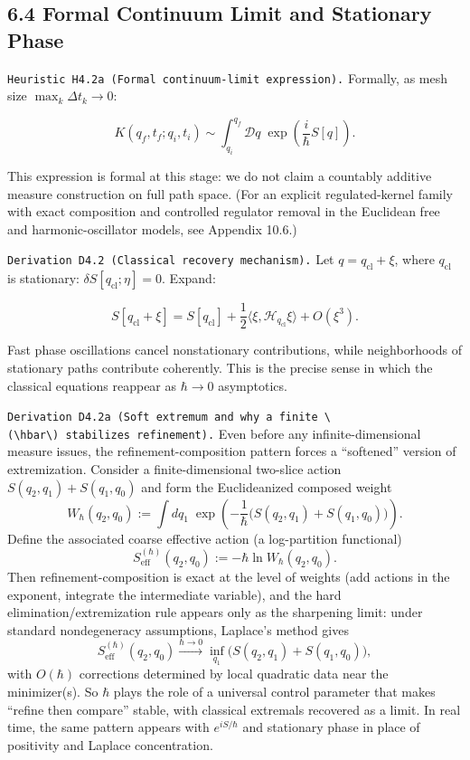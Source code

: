 \documentclass[
]{article}
\begin{document}
\hypertarget{formal-continuum-limit-and-stationary-phase}{%
\subsection{6.4 Formal Continuum Limit and Stationary
Phase}\label{formal-continuum-limit-and-stationary-phase}}

\texttt{Heuristic\ H4.2a\ (Formal\ continuum-limit\ expression).}
Formally, as mesh size \(\max_k\Delta t_k\to0\):

\[
K(q_f,t_f;q_i,t_i)\sim
\int_{q_i}^{q_f}\mathcal Dq\;
\exp\!\left(\frac{i}{\hbar}S[q]\right).
\]

This expression is formal at this stage: we do not claim a countably
additive measure construction on full path space. (For an explicit
regulated-kernel family with exact composition and controlled regulator
removal in the Euclidean free and harmonic-oscillator models, see
Appendix 10.6.)

\texttt{Derivation\ D4.2\ (Classical\ recovery\ mechanism).} Let
\(q=q_{\mathrm{cl}}+\xi\), where \(q_{\mathrm{cl}}\) is stationary:
\(\delta S[q_{\mathrm{cl}};\eta]=0\). Expand:

\[
S[q_{\mathrm{cl}}+\xi]
=S[q_{\mathrm{cl}}]
+\frac12\langle \xi,\mathcal H_{q_{\mathrm{cl}}}\xi\rangle
+O(\xi^3).
\]

Fast phase oscillations cancel nonstationary contributions, while
neighborhoods of stationary paths contribute coherently. This is the
precise sense in which the classical equations reappear as \(\hbar\to0\)
asymptotics.

\texttt{Derivation\ D4.2a\ (Soft\ extremum\ and\ why\ a\ finite\ \textbackslash{}(\textbackslash{}hbar\textbackslash{})\ stabilizes\ refinement).}
Even before any infinite-dimensional measure issues, the
refinement-composition pattern forces a ``softened'' version of
extremization. Consider a finite-dimensional two-slice action
\(S(q_2,q_1)+S(q_1,q_0)\) and form the Euclideanized composed weight \[
W_\hbar(q_2,q_0):=\int dq_1\;\exp\!\left(-\frac{1}{\hbar}\big(S(q_2,q_1)+S(q_1,q_0)\big)\right).
\] Define the associated coarse effective action (a log-partition
functional) \[
S_{\mathrm{eff}}^{(\hbar)}(q_2,q_0):=-\hbar\ln W_\hbar(q_2,q_0).
\] Then refinement-composition is exact at the level of weights (add
actions in the exponent, integrate the intermediate variable), and the
hard elimination/extremization rule appears only as the sharpening
limit: under standard nondegeneracy assumptions, Laplace's method gives
\[
S_{\mathrm{eff}}^{(\hbar)}(q_2,q_0)
\xrightarrow{\hbar\to0}
\inf_{q_1}\big(S(q_2,q_1)+S(q_1,q_0)\big),
\] with \(O(\hbar)\) corrections determined by local quadratic data near
the minimizer(s). So \(\hbar\) plays the role of a universal control
parameter that makes ``refine then compare'' stable, with classical
extremals recovered as a limit. In real time, the same pattern appears
with \(e^{iS/\hbar}\) and stationary phase in place of positivity and
Laplace concentration.
\end{document}
